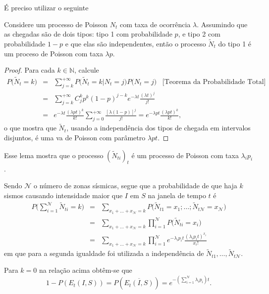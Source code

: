 É preciso utilizar o seguinte
\begin{lemma}
Considere um processo de Poisson $N_t$ com taxa de ocorrência $\lambda$.
Assumindo que as chegadas são de dois tipos: tipo 1 com probabilidade $p$,
e tipo 2 com probabilidade  $1 - p$ e que elas são independentes,
então o processo $\tilde N_t$ do tipo 1 é um proceso de Poisson com taxa
$\lambda p$.
\end{lemma}
\begin{proof} Para cada $k \in \mathbb{N}$, calcule
$$
\begin{array}{lll}
P\Big(\tilde N_{t} =k \Big) & = & \displaystyle \sum_{j=k}^{+\infty} P\Big(\tilde N_{t} =k | N_{t}
=j\Big)  P \Big( N_{t} =j  \Big)\;\;\;\mbox{[Teorema da Probabilidade Total]}\\
&=& \displaystyle \sum_{j=k}^{+\infty} C_j^k p^k (1-p)^{j-k} e^{-\lambda t} \frac{(\lambda t)^j}{j!} \\
&=&e^{-\lambda t} \frac{(\lambda p t)^k}{k!} \displaystyle \sum_{j=0}^{+\infty} \frac{[\lambda (1-p)]^{j}}{j!} = e^{-\lambda p t} \frac{(\lambda p t)^k}{k!},
\end{array}
$$
o que mostra que $\tilde N_{t}$, usando a independência dos tipos de chegada em
intervalos disjuntos, é uma \gls{va} de Poisson com parâmetro
$\lambda p t$.\hfill
\end{proof}

Esse lema mostra que o processo $(\tilde N_{t i})_t$ é um processo de Poisson com taxa $\lambda_i p_i$.

Sendo $\mathcal{N}$ o número de zonas sísmicas, segue que a probabilidade de que haja $k$ sismos causando
intensidade maior que $I$ em $S$ na janela de tempo $t$ é
$$
\displaystyle
\begin{array}{lll}
P\Big(\displaystyle \sum_{i=1}^{\mathcal{N}} \tilde N_{t i} = k\Big)
&= &\displaystyle \sum_{x_1+\ldots +x_{\mathcal{N}}=k} P\Big(\tilde N_{t 1} = x_1; \ldots; \tilde N_{t \mathcal{N}} = x_{\mathcal{N}} \Big)\\
&= &\displaystyle{\sum_{x_1+\ldots +x_{\mathcal{N}}=k} \prod_{i=1}^{\mathcal{N}}}P\Big(\tilde N_{t i} = x_i \Big)\\
&= &\displaystyle \sum_{x_1+\ldots +x_{\mathcal{N}}=k} \prod_{i=1}^{\mathcal{N}} e^{-\lambda_i p_i t} \frac{(\lambda_i p_i t)^{x_i}}{x_{i}!}
\end{array}
$$
em que para a segunda igualdade foi utilizada a independência de  ${\tilde N}_{t 1}, \ldots, {\tilde N}_{t
\mathcal{N}}$.


Para $k=0$ na relação acima obtêm-se que
\begin{equation} \label{probinterest}
1-P( E_t(I, S) )= P(\overline{E_t(I, S)})=e^{-(\sum_{i=1}^{\mathcal{N}} \lambda_i p_i) t}.
\end{equation}

